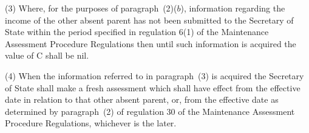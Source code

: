 \documentclass[12pt,a4paper]{article}
\begin{document}
(3) Where, for the purposes of paragraph~(2)($b$), information regarding the income of the other absent parent has not been submitted to the Secretary of State 
within the period specified in regulation 6(1) of the Maintenance Assessment Procedure Regulations then until such information is acquired the value of C shall be nil.

(4) When the information referred to in paragraph~(3) is acquired the 
Secretary of State  %
shall make a fresh assessment which shall have effect from the effective date in relation to that other absent 
parent, or, from the effective date as determined by paragraph~(2) of regulation 30 of the Maintenance Assessment Procedure Regulations, whichever is the later.  %
\end{document}
